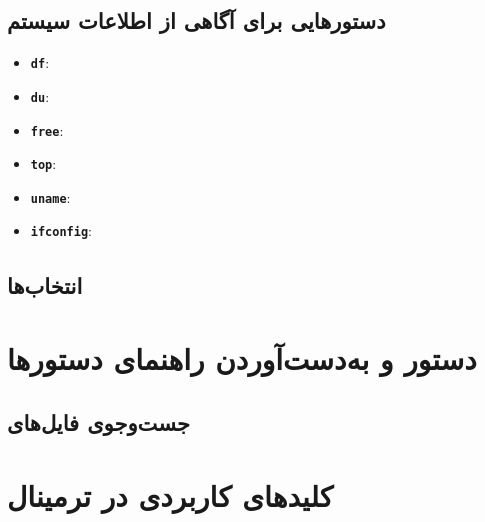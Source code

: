 \subsection{دستورهایی برای آگاهی از اطلاعات سیستم}
\begin{itemize}
\item \textbf{\texttt{\Large df}}:
\item \textbf{\texttt{\Large du}}:
\item \textbf{\texttt{\Large free}}:
\item \textbf{\texttt{\Large top}}:
\item \textbf{\texttt{\Large uname}}:
\item \textbf{\texttt{\Large ifconfig}}:
\end{itemize}

\subsection{انتخاب‌ها}

\section[دستور man و به‌دست‌آوردن راهنمای دستورها]{دستور  و به‌دست‌آوردن راهنمای دستورها}
\subsection[جست‌وجوی فایل‌های man]{جست‌وجوی فایل‌های }

\section{کلیدهای کاربردی در ترمینال}
